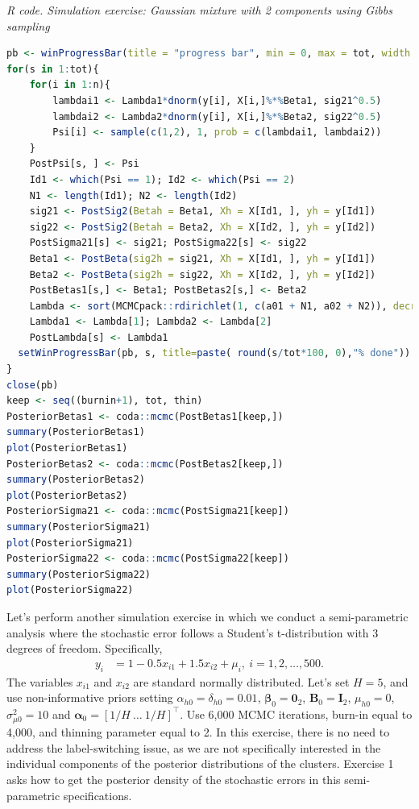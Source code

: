 \begin{tcolorbox}[enhanced,width=4.67in,center upper,
	fontupper=\large\bfseries,drop shadow southwest,sharp corners]
	\textit{R code. Simulation exercise: Gaussian mixture with 2 components using Gibbs sampling}
	\begin{VF}
		\begin{lstlisting}[language=R]
pb <- winProgressBar(title = "progress bar", min = 0, max = tot, width = 300)
for(s in 1:tot){
	for(i in 1:n){
		lambdai1 <- Lambda1*dnorm(y[i], X[i,]%*%Beta1, sig21^0.5)
		lambdai2 <- Lambda2*dnorm(y[i], X[i,]%*%Beta2, sig22^0.5)
		Psi[i] <- sample(c(1,2), 1, prob = c(lambdai1, lambdai2))
	}
	PostPsi[s, ] <- Psi
	Id1 <- which(Psi == 1); Id2 <- which(Psi == 2)
	N1 <- length(Id1); N2 <- length(Id2)
	sig21 <- PostSig2(Betah = Beta1, Xh = X[Id1, ], yh = y[Id1])
	sig22 <- PostSig2(Betah = Beta2, Xh = X[Id2, ], yh = y[Id2])
	PostSigma21[s] <- sig21; PostSigma22[s] <- sig22
	Beta1 <- PostBeta(sig2h = sig21, Xh = X[Id1, ], yh = y[Id1])
	Beta2 <- PostBeta(sig2h = sig22, Xh = X[Id2, ], yh = y[Id2])
	PostBetas1[s,] <- Beta1; PostBetas2[s,] <- Beta2
	Lambda <- sort(MCMCpack::rdirichlet(1, c(a01 + N1, a02 + N2)), decreasing = TRUE)
	Lambda1 <- Lambda[1]; Lambda2 <- Lambda[2]
	PostLambda[s] <- Lambda1 
  setWinProgressBar(pb, s, title=paste( round(s/tot*100, 0),"% done"))
}
close(pb)
keep <- seq((burnin+1), tot, thin)
PosteriorBetas1 <- coda::mcmc(PostBetas1[keep,])
summary(PosteriorBetas1)
plot(PosteriorBetas1)
PosteriorBetas2 <- coda::mcmc(PostBetas2[keep,])
summary(PosteriorBetas2)
plot(PosteriorBetas2)
PosteriorSigma21 <- coda::mcmc(PostSigma21[keep])
summary(PosteriorSigma21)
plot(PosteriorSigma21)
PosteriorSigma22 <- coda::mcmc(PostSigma22[keep])
summary(PosteriorSigma22)
plot(PosteriorSigma22)
\end{lstlisting}
	\end{VF}
\end{tcolorbox}

Let's perform another simulation exercise in which we conduct a semi-parametric analysis where the stochastic error follows a Student's t-distribution with 3 degrees of freedom. Specifically,  
\begin{align*}
	y_i &= 1 - 0.5x_{i1} + 1.5x_{i2} + \mu_i, \ i=1,2,\dots,500.
\end{align*}
The variables $x_{i1}$ and $x_{i2}$ are standard normally distributed. Let's set $H=5$, and use non-informative priors setting $\alpha_{h0}=\delta_{h0}=0.01$, $\boldsymbol{\beta}_0=\boldsymbol{0}_2$, $\boldsymbol{B}_0=\boldsymbol{I}_2$, $\mu_{h0}=0$, $\sigma^2_{\mu 0}=10$ and $\boldsymbol{\alpha}_0=[1/H \ \dots \ 1/H]^{\top}$. Use 6,000 MCMC iterations, burn-in equal to 4,000, and thinning parameter equal to 2. In this exercise, there is no need to address the label-switching issue, as we are not specifically interested in the individual components of the posterior distributions of the clusters. Exercise 1 asks how to get the posterior density of the stochastic errors in this semi-parametric specifications. 

